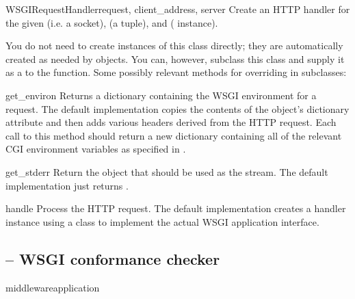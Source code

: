 \begin{classdesc}{WSGIRequestHandler}{request, client_address, server}
Create an HTTP handler for the given  (i.e. a socket),
 (a  tuple), and 
( instance).

You do not need to create instances of this class directly; they are
automatically created as needed by  objects.  You
can, however, subclass this class and supply it as a 
to the  function.  Some possibly relevant
methods for overriding in subclasses:

\begin{methoddesc}{get_environ}{}
Returns a dictionary containing the WSGI environment for a request.  The
default implementation copies the contents of the 
object's  dictionary attribute and then adds
various headers derived from the HTTP request.  Each call to this method
should return a new dictionary containing all of the relevant CGI
environment variables as specified in .
\end{methoddesc}

\begin{methoddesc}{get_stderr}{}
Return the object that should be used as the  stream.
The default implementation just returns .
\end{methoddesc}

\begin{methoddesc}{handle}{}
Process the HTTP request.  The default implementation creates a handler
instance using a  class to implement the actual
WSGI application interface.
\end{methoddesc}

\end{classdesc}









\subsection{ -- WSGI conformance checker}

\begin{funcdesc}{middleware}{application}
\end{funcdesc}




































